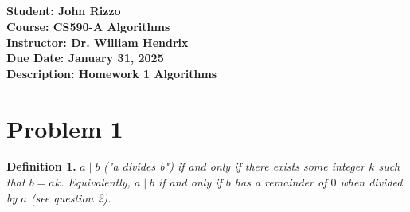 \documentclass[12pt, letterpaper]{article}
\title{\classname \\ \assignmentdescription}
\author{\studentname}
\date{\duedate}
\newcommand{\studentname}          {John Rizzo           }
\newcommand{\classname}            {CS590-A Algorithms   }
\newcommand{\professorname}        {Dr. William Hendrix  }
\newcommand{\assignmentdescription}{Homework 1 Algorithms}
\newcommand{\duedate}              {January 31, 2025     }
\begin{document}
\noindent
\normalsize \textbf{Student:     \studentname} \\ [5pt]
            \textbf{Course:      \classname} \\ [5pt]
            \textbf{Instructor:  \professorname} \\ [5pt]
            \textbf{Due Date:    \duedate} \\ [5pt]
            \textbf{Description: \assignmentdescription}

\vspace{0.5cm}

\section*{Problem 1}
\textbf{Definition 1.} $a \mid b$ \textit{("a divides b") if and only if there exists some integer $k$ such that $b = ak$. Equivalently, $a \mid b$ if and only if $b$ has a remainder of $0$ when divided by $a$ (see question 2).}
\end{document}
